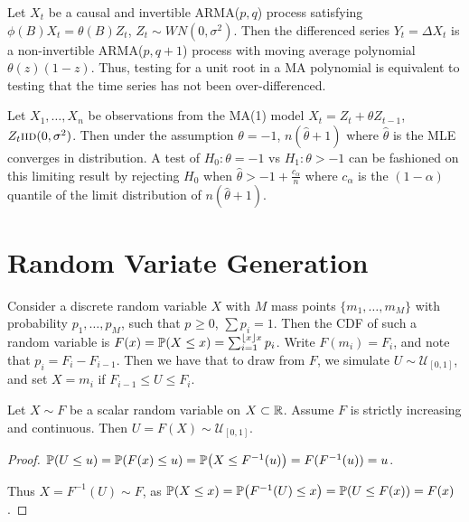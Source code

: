 \begin{thm}
  \label{sec:unit-roots-test}
  Let $X_{t}$ be a causal and invertible \textsc{ARMA}($p, q$) process
  satisfying $\phi(B)X_{t} = \theta(B) Z_{t}$, $Z_{t} \sim WN(0,
  \sigma^{2})$.  Then the differenced series $Y_{t} = \Delta X_{t}$ is
  a non-invertible \textsc{ARMA}($p, q+1$) process with moving average
  polynomial $\theta(z)(1-z)$.  Thus, testing for a unit root in a MA
  polynomial is equivalent to testing that the time series has not been
  over-differenced.

  Let $X_{1}, \dots, X_{n}$ be observations from the MA(1) model $X_{t}
  = Z_{t} + \theta Z_{t-1}$, $Z_{t} \textsc{iid}(0, \sigma^{2})$.  Then under
  the assumption $\theta = -1$, $n(\hat \theta + 1)$ where $\hat
  \theta$ is the MLE converges in distribution.  A test of $H_{0}:
  \theta = -1$ vs $H_{1}: \theta > -1$ can be fashioned on this
  limiting result by rejecting $H_{0}$ when $\hat \theta > -1 +
  \frac{c_{\alpha}}{n}$ where $c_{\alpha}$ is the $(1 - \alpha)$
  quantile of the limit distribution of $n(\hat \theta + 1)$.
\end{thm}


\section{Random Variate Generation}
\label{sec:monte-carlo}

\begin{thm}
  \label{sec:monte-carlo-2}
  Consider a discrete random variable $X$ with $M$ mass points $\{
  m_{1}, \dots, m_{M} \}$ with probability $p_{1}, \dots, p_{M}$, such
  that $p_{} \geq 0$, $\sum p_{i} = 1$.  Then the CDF of such a random
  variable is $F(x) = \Prob{X \leq x} = \sum_{i=1}^{\lfloor x \rfloor
    x} p_{i}$.  Write $F(m_{i}) = F_{i}$, and note that $p_{i} = F_{i}
  - F_{i-1}$.  Then we have that to draw from $F$, we simulate $U \sim
  \mathcal{U}_{[0, 1]}$, and set $X = m_{i}$ if $F_{i-1} \leq U \leq F_{i}$.
\end{thm}

\begin{thm}
  \label{sec:monte-carlo-3}
  Let $X \sim F$ be a scalar random variable on $X \subset \mathbb{R}$.
  Assume $F$ is strictly increasing and continuous.  Then $U = F(X)
  \sim \mathcal{U}_{[0, 1]}$.
\end{thm}

\begin{proof}
  $\Prob{U \leq u} = \Prob{F(x) \leq u} = \Prob{X \leq F^{-1}(u)} =
  F(F^{-1}(u)) = u$.

  Thus $X = F^{-1}(U) \sim F$, as $\Prob{X \leq x} = \Prob{F^{-1}(U)
    \leq x} = \Prob{U \leq F(x)} = F(x)$.
\end{proof}

